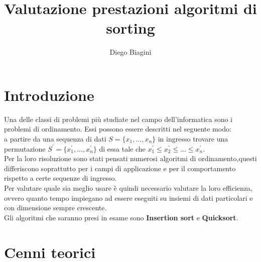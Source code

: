 \documentclass[]{article}
\author{Diego Biagini}
\date{}
\title{Valutazione prestazioni algoritmi di sorting}
\begin{document}
\maketitle
\section{Introduzione}
Una delle classi di problemi più studiate nel campo dell'informatica sono i problemi di ordinamento.
Essi possono essere descritti nel seguente modo:\\ a partire da una sequenza di dati 
$S = \{x_1, ... , x_n\}$ in ingresso trovare una permutazione $S^{\prime} = \{x_1^{\prime}, ... , x_n^{\prime}\}$ di essa tale che $x_1^{\prime} \leq x_2^{\prime} \leq ... \leq x_n^\prime$.\\
Per la loro risoluzione sono stati pensati numerosi algoritmi di ordinamento,questi differiscono soprattutto per i campi di applicazione e per il comportamento rispetto a certe sequenze di ingresso.\\
Per valutare quale sia meglio usare è quindi necessario valutare la loro efficienza, ovvero quanto tempo impiegano ad essere eseguiti su insiemi di dati particolari e con dimensione sempre crescente.\\
Gli algoritmi che saranno presi in esame sono \textbf{Insertion sort} e \textbf{Quicksort}.


\section{Cenni teorici}
\end{document}
